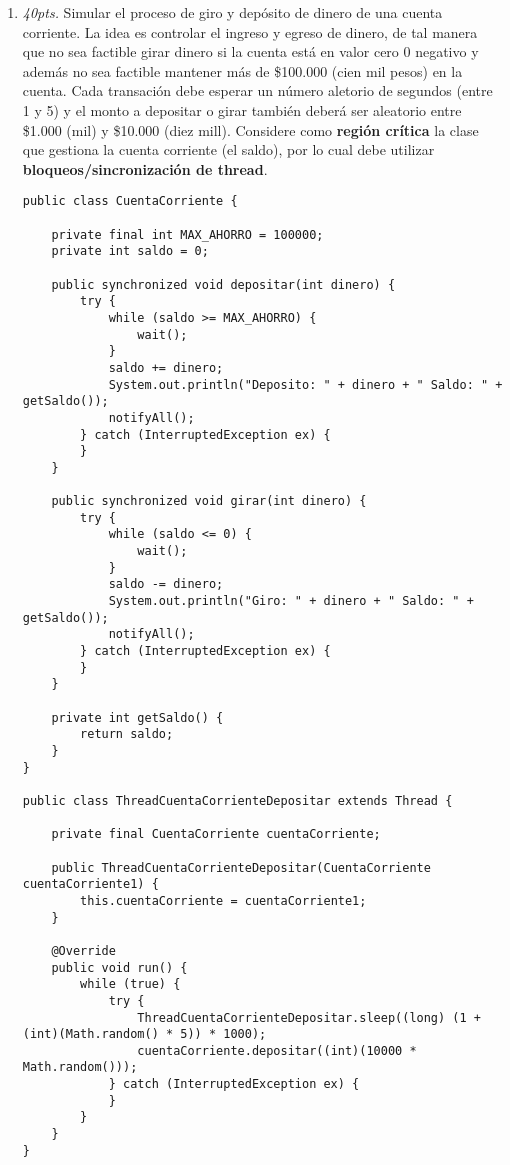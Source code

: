 \documentclass[10pt]{article}
\begin{document}
{\begin{enumerate}
		\newpage

		\item \emph{40pts.} Simular el proceso de giro y dep\'osito de dinero de una cuenta corriente. La idea es controlar el ingreso y egreso de dinero, de tal manera que no sea factible girar dinero si la cuenta est\'a en valor cero 0 negativo y adem\'as no sea factible mantener m\'as de \$100.000 (cien mil pesos) en la cuenta. Cada transaci\'on debe esperar un n\'umero aletorio de segundos (entre 1 y 5) y el monto a depositar o girar tambi\'en deber\'a ser aleatorio entre \$1.000 (mil) y \$10.000 (diez mill). Considere como \textbf{regi\'on cr\'itica} la clase que gestiona la cuenta corriente (el saldo), por lo cual debe utilizar \textbf{bloqueos/sincronizaci\'on de thread}.

\begin{verbatim}
public class CuentaCorriente {

    private final int MAX_AHORRO = 100000;
    private int saldo = 0;

    public synchronized void depositar(int dinero) {
        try {
            while (saldo >= MAX_AHORRO) {
                wait();
            }
            saldo += dinero;
            System.out.println("Deposito: " + dinero + " Saldo: " + getSaldo());
            notifyAll();
        } catch (InterruptedException ex) {
        }
    }

    public synchronized void girar(int dinero) {
        try {
            while (saldo <= 0) {
                wait();
            }
            saldo -= dinero;
            System.out.println("Giro: " + dinero + " Saldo: " + getSaldo());
            notifyAll();
        } catch (InterruptedException ex) {
        }
    }

    private int getSaldo() {
        return saldo;
    }
}

public class ThreadCuentaCorrienteDepositar extends Thread {

    private final CuentaCorriente cuentaCorriente;

    public ThreadCuentaCorrienteDepositar(CuentaCorriente cuentaCorriente1) {
        this.cuentaCorriente = cuentaCorriente1;
    }
    
    @Override
    public void run() {
        while (true) {
            try {
                ThreadCuentaCorrienteDepositar.sleep((long) (1 + (int)(Math.random() * 5)) * 1000);
                cuentaCorriente.depositar((int)(10000 * Math.random()));
            } catch (InterruptedException ex) {
            }
        }
    }
}


\end{verbatim}
\end{enumerate}}
\end{document}

